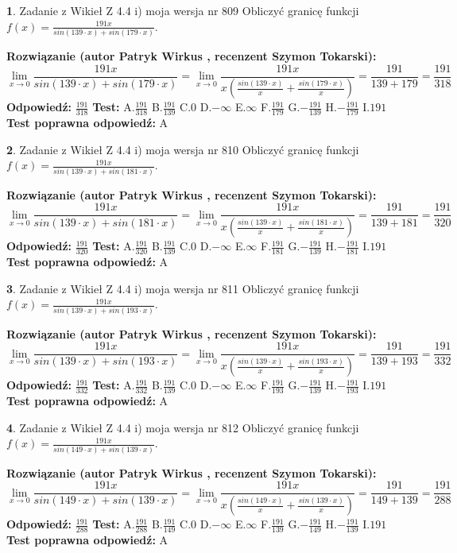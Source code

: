 \documentclass[12pt, a4paper]{article}
\theoremstyle{definition} %
\newtheorem{zad}{}
\newcommand{\zadStart}[1]{\begin{zad}#1\newline}
\newcommand{\zadStop}{\end{zad}}
\newcommand{\rozwStart}[2]{\noindent \textbf{Rozwiązanie (autor #1 , recenzent #2): }\newline}
\newcommand{\rozwStop}{\newline}
\newcommand{\odpStart}{\noindent \textbf{Odpowiedź:}\newline}
\newcommand{\odpStop}{\newline}
\newcommand{\testStart}{\noindent \textbf{Test:}\newline}
\newcommand{\testStop}{\newline}
\newcommand{\kluczStart}{\noindent \textbf{Test poprawna odpowiedź:}\newline}
\newcommand{\kluczStop}{\newline}
\begin{document}
\zadStart{Zadanie z Wikieł Z 4.4 i) moja wersja nr 809}
Obliczyć granicę funkcji $f(x)=\frac{191x}{sin(139\cdot x) +sin(179\cdot x)}$.
\zadStop
\rozwStart{Patryk Wirkus}{Szymon Tokarski}
$$\lim\limits_{x\to 0}\frac{191x}{sin(139\cdot x) +sin(179\cdot x)}=\lim\limits_{x\to 0}\frac{191x}{x(\frac{sin(139\cdot x)}{x}+\frac{sin(179\cdot x)}{x})}=\frac{191}{139+179} = \frac{191}{318}$$
\rozwStop
\odpStart
$\frac{191}{318}$
\odpStop
\testStart
A.$\frac{191}{318}$
B.$\frac{191}{139}$
C.$0$
D.$-\infty$
E.$\infty$
F.$\frac{191}{179}$
G.$-\frac{191}{139}$
H.$-\frac{191}{179}$
I.$191$
\testStop
\kluczStart
A
\kluczStop



\zadStart{Zadanie z Wikieł Z 4.4 i) moja wersja nr 810}
Obliczyć granicę funkcji $f(x)=\frac{191x}{sin(139\cdot x) +sin(181\cdot x)}$.
\zadStop
\rozwStart{Patryk Wirkus}{Szymon Tokarski}
$$\lim\limits_{x\to 0}\frac{191x}{sin(139\cdot x) +sin(181\cdot x)}=\lim\limits_{x\to 0}\frac{191x}{x(\frac{sin(139\cdot x)}{x}+\frac{sin(181\cdot x)}{x})}=\frac{191}{139+181} = \frac{191}{320}$$
\rozwStop
\odpStart
$\frac{191}{320}$
\odpStop
\testStart
A.$\frac{191}{320}$
B.$\frac{191}{139}$
C.$0$
D.$-\infty$
E.$\infty$
F.$\frac{191}{181}$
G.$-\frac{191}{139}$
H.$-\frac{191}{181}$
I.$191$
\testStop
\kluczStart
A
\kluczStop



\zadStart{Zadanie z Wikieł Z 4.4 i) moja wersja nr 811}
Obliczyć granicę funkcji $f(x)=\frac{191x}{sin(139\cdot x) +sin(193\cdot x)}$.
\zadStop
\rozwStart{Patryk Wirkus}{Szymon Tokarski}
$$\lim\limits_{x\to 0}\frac{191x}{sin(139\cdot x) +sin(193\cdot x)}=\lim\limits_{x\to 0}\frac{191x}{x(\frac{sin(139\cdot x)}{x}+\frac{sin(193\cdot x)}{x})}=\frac{191}{139+193} = \frac{191}{332}$$
\rozwStop
\odpStart
$\frac{191}{332}$
\odpStop
\testStart
A.$\frac{191}{332}$
B.$\frac{191}{139}$
C.$0$
D.$-\infty$
E.$\infty$
F.$\frac{191}{193}$
G.$-\frac{191}{139}$
H.$-\frac{191}{193}$
I.$191$
\testStop
\kluczStart
A
\kluczStop



\zadStart{Zadanie z Wikieł Z 4.4 i) moja wersja nr 812}
Obliczyć granicę funkcji $f(x)=\frac{191x}{sin(149\cdot x) +sin(139\cdot x)}$.
\zadStop
\rozwStart{Patryk Wirkus}{Szymon Tokarski}
$$\lim\limits_{x\to 0}\frac{191x}{sin(149\cdot x) +sin(139\cdot x)}=\lim\limits_{x\to 0}\frac{191x}{x(\frac{sin(149\cdot x)}{x}+\frac{sin(139\cdot x)}{x})}=\frac{191}{149+139} = \frac{191}{288}$$
\rozwStop
\odpStart
$\frac{191}{288}$
\odpStop
\testStart
A.$\frac{191}{288}$
B.$\frac{191}{149}$
C.$0$
D.$-\infty$
E.$\infty$
F.$\frac{191}{139}$
G.$-\frac{191}{149}$
H.$-\frac{191}{139}$
I.$191$
\testStop
\kluczStart
A
\kluczStop
\end{document}
